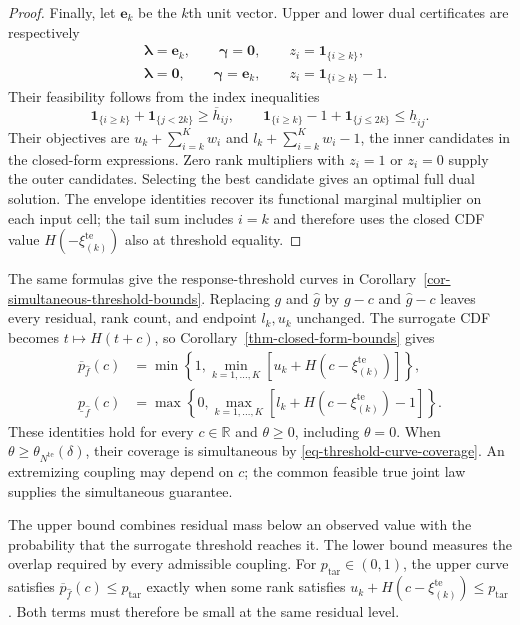 \documentclass[review,11pt,3p,authoryear,nopreprintline]{elsarticle}
\begin{document}
\begin{proof}
  Finally, let $\bm e_k$ be the $k$th unit vector. Upper and lower dual certificates are respectively
  \begin{align*}
    &\bm\lambda=\bm e_k,\qquad\bm\gamma=\bm0,\qquad
      z_i=\mathbf1_{\{i\ge k\}},\\
    &\bm\lambda=\bm0,\qquad\bm\gamma=\bm e_k,\qquad
      z_i=\mathbf1_{\{i\ge k\}}-1.
  \end{align*}
  Their feasibility follows from the index inequalities
  \[
    \mathbf1_{\{i\ge k\}}+\mathbf1_{\{j<2k\}}\ge\overline h_{ij},
    \qquad
    \mathbf1_{\{i\ge k\}}-1+\mathbf1_{\{j\le2k\}}\le\underline h_{ij}.
  \]
  Their objectives are $u_k+\sum_{i=k}^{K}w_i$ and $l_k+\sum_{i=k}^{K}w_i-1$, the inner candidates in the closed-form expressions. Zero rank multipliers with $z_i=1$ or $z_i=0$ supply the outer candidates. Selecting the best candidate gives an optimal full dual solution. The envelope identities recover its functional marginal multiplier on each input cell; the tail sum includes $i=k$ and therefore uses the closed CDF value $H\left(-\xi_{(k)}^{\mathrm{te}}\right)$ also at threshold equality.
\end{proof}

The same formulas give the response-threshold curves in Corollary~\ref{cor-simultaneous-threshold-bounds}. Replacing $g$ and $\hat g$ by $g-c$ and $\hat g-c$ leaves every residual, rank count, and endpoint $l_k,u_k$ unchanged. The surrogate CDF becomes $t\mapsto H(t+c)$, so Corollary~\ref{thm-closed-form-bounds} gives
\begin{align}
  \overline p_{\hat f}(c)
    &=\min\left\{1,\min_{k=1,\ldots,K}\left[u_k+H\left(c-\xi_{(k)}^{\mathrm{te}}\right)\right]\right\},
    \label{eq-threshold-closed-upper}\\
  \underline p_{\hat f}(c)
    &=\max\left\{0,\max_{k=1,\ldots,K}\left[l_k+H\left(c-\xi_{(k)}^{\mathrm{te}}\right)-1\right]\right\}.
    \label{eq-threshold-closed-lower}
\end{align}
These identities hold for every $c\in\mathbb R$ and $\theta\ge0$, including $\theta=0$. When $\theta\ge\theta_{N^{\mathrm{te}}}(\delta)$, their coverage is simultaneous by \eqref{eq-threshold-curve-coverage}. An extremizing coupling may depend on $c$; the common feasible true joint law supplies the simultaneous guarantee.

The upper bound combines residual mass below an observed value with the probability that the surrogate threshold reaches it. The lower bound measures the overlap required by every admissible coupling. For $p_{\mathrm{tar}}\in(0,1)$, the upper curve satisfies $\overline p_{\hat f}(c)\le p_{\mathrm{tar}}$ exactly when some rank satisfies $u_k+H\left(c-\xi_{(k)}^{\mathrm{te}}\right)\le p_{\mathrm{tar}}$. Both terms must therefore be small at the same residual level.
\end{document}
